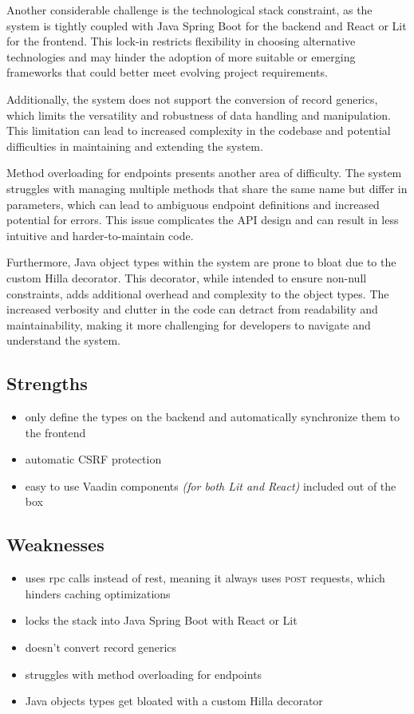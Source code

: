 Another considerable challenge is the technological stack constraint, as the system is tightly coupled with Java Spring Boot for the backend and React or Lit for the frontend. This lock-in restricts flexibility in choosing alternative technologies and may hinder the adoption of more suitable or emerging frameworks that could better meet evolving project requirements.

Additionally, the system does not support the conversion of record generics, which limits the versatility and robustness of data handling and manipulation. This limitation can lead to increased complexity in the codebase and potential difficulties in maintaining and extending the system.

Method overloading for endpoints presents another area of difficulty. The system struggles with managing multiple methods that share the same name but differ in parameters, which can lead to ambiguous endpoint definitions and increased potential for errors. This issue complicates the API design and can result in less intuitive and harder-to-maintain code.

Furthermore, Java object types within the system are prone to bloat due to the custom Hilla  decorator. This decorator, while intended to ensure non-null constraints, adds additional overhead and complexity to the object types. The increased verbosity and clutter in the code can detract from readability and maintainability, making it more challenging for developers to navigate and understand the system.


\subsection{Strengths}
\label{subsec:hilla:strengths}
\begin{itemize}
    \item only define the types on the backend and automatically synchronize them to the frontend
    \item automatic CSRF protection
    \item easy to use Vaadin components \textit{(for both Lit and React)} included out of the box
\end{itemize}

\subsection{Weaknesses}
\label{subsec:hilla:weaknesses}
\begin{itemize}
    \item uses \acrshort{rpc} calls instead of \acrshort{rest}, meaning it always uses \textsc{post} requests, which hinders caching optimizations
    \item locks the stack into Java Spring Boot with React or Lit
    \item doesn't convert record generics
    \item struggles with method overloading for endpoints
    \item Java objects types get bloated with a custom Hilla  decorator
\end{itemize}

